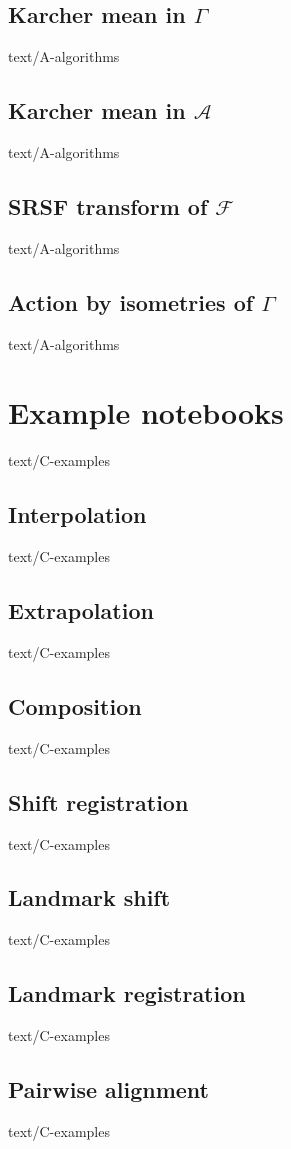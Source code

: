 \documentclass[epsbased,copyleft,final,loe, lof,extendedindex,firstnumbered,tfg,english]{tfgtfmthesisuam}
\begin{document}
  \section{Karcher mean in $\Gamma$\label{SEC:KARCHERG}}{text/A-algorithms}
  \section{Karcher mean in $\mathcal{A}$\label{SEC:KARCHERA}}{text/A-algorithms}
  \section{SRSF transform of $\mathcal{F}$\label{SEC:MAPPING}}{text/A-algorithms}
  \section{Action by isometries of $\Gamma$\label{SEC:ACTION}}{text/A-algorithms}


\chapter{Example notebooks\label{CAP:EXAMPLES}}{text/C-examples}
	\section{Interpolation\label{EX:INTERPOLATION}}{text/C-examples}
	\section{Extrapolation\label{EX:EXTRAPOLATION}}{text/C-examples}
	\section{Composition\label{EX:COMPOSITION}}{text/C-examples}
	\section{Shift registration\label{EX:SHIFT}}{text/C-examples}
	\section{Landmark shift\label{EX:LANDSHIFT}}{text/C-examples}
	\section{Landmark registration\label{EX:LANDMARKREG}}{text/C-examples}
	\section{Pairwise alignment\label{EX:PAIRWISE}}{text/C-examples}
\end{document}
